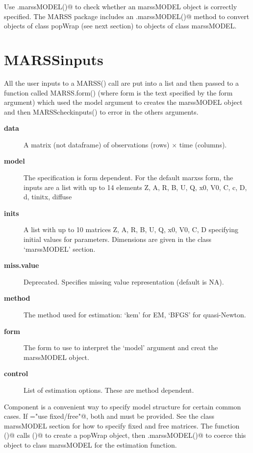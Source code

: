 Use \verb@is.marssMODEL()@ to check whether an marssMODEL object is correctly specified. The MARSS package includes an \verb@as.marssMODEL()@ method to convert objects of class popWrap (see next section) to objects of class marssMODEL. 

\section*{MARSSinputs}

All the user inputs to a MARSS() call are put into a list and then passed to a function called MARSS.form() (where form is the text specified by the form argument) which used the model argument to creates the marssMODEL object and then MARSScheckinputs() to error in the others arguments.

  \begin{description}
  
  \item[\textbf{data}]{ A matrix (not dataframe) of observations (rows) $\times$ time (columns).  }
  \item[\textbf{model}]{ The specification is form dependent.  For the default marxss form, the inputs are a list with up to 14  elements Z, A, R, B, U, Q, x0, V0, C, c, D, d, tinitx, diffuse }
  \item[\textbf{inits}]{ A list with up to 10 matrices Z, A, R, B, U, Q, x0, V0, C, D specifying initial values for parameters. Dimensions are given in the class `marssMODEL' section. }
  \item[\textbf{miss.value}]{ Deprecated. Specifies missing value representation (default is NA). }
  \item[\textbf{method}]{ The method used for estimation: `kem' for EM, `BFGS' for quasi-Newton.}
  \item[\textbf{form}]{ The form to use to interpret the `model' argument and creat the marssMODEL object.}
  \item[\textbf{control}]{ List of estimation options. These are method dependent. }  
  \end{description}

Component \verb@model@ is a convenient way to specify model structure for certain common cases.  If \verb@model="use fixed/free"@, both \verb@fixed@ and \verb@free@ must be provided.  See the class marssMODEL section for how to specify fixed and free matrices.  The function \verb@MARSS()@ calls \verb@popWrap()@ to create a popWrap object, then \verb@is.marssMODEL()@ to coerce this object to class marssMODEL for the estimation function.

